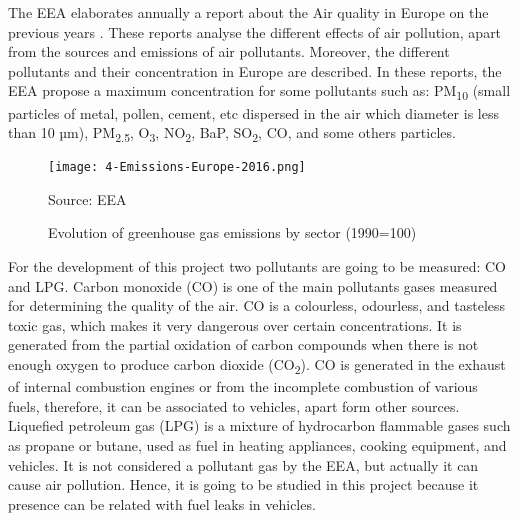 The \acf{EEA} elaborates annually a report about the Air quality in Europe on the previous years \cite{AirQualityEEA17}. These reports analyse the different effects of air pollution, apart from the sources and emissions of air pollutants. Moreover, the different pollutants and their concentration in Europe are described. In these reports, the \ac{EEA} propose a maximum concentration for some pollutants such as: PM\textsubscript{10} (small particles of metal, pollen, cement, etc dispersed in the air which diameter is less than 10 µm), PM\textsubscript{2.5}, O\textsubscript{3}, NO\textsubscript{2}, BaP, SO\textsubscript{2}, CO, and some others particles.

\begin{figure}[!h]
	\begin{center}
		\texttt{[image: 4-Emissions-Europe-2016.png]}	
		\caption{Evolution of greenhouse gas emissions by sector (1990=100)}{Source: \acf{EEA}}
		\label{fig:4-Emissions-Europe-2016}
	\end{center}
\end{figure}

For the development of this project two pollutants are going to be measured: CO and LPG. Carbon monoxide (CO) is one of the main pollutants gases measured for determining the quality of the air. CO is a colourless, odourless, and tasteless toxic gas, which makes it very dangerous over certain concentrations. It is generated from the partial oxidation of carbon compounds when there is not enough oxygen to produce carbon dioxide (CO\textsubscript{2}). CO is generated in the exhaust of internal combustion engines or from the incomplete combustion of various fuels, therefore, it can be associated to vehicles, apart form other sources. Liquefied petroleum gas (LPG) is a mixture of hydrocarbon flammable gases such as propane or butane, used as fuel in heating appliances, cooking equipment, and vehicles. It is not considered a pollutant gas by the \ac{EEA}, but actually it can cause air pollution. Hence, it is going to be studied in this project because it presence can be related with fuel leaks in vehicles.


